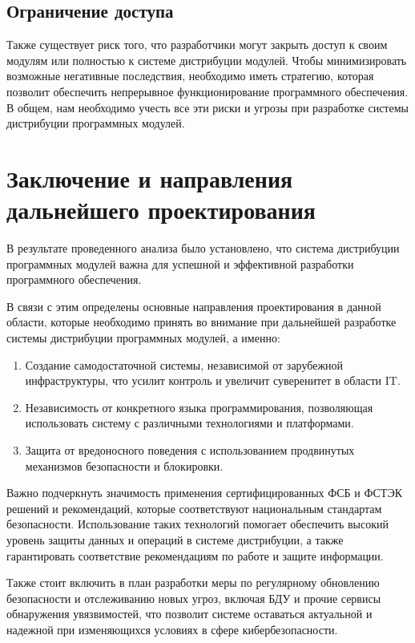 \subsection{Ограничение доступа}

Также существует риск того, что разработчики могут закрыть доступ к своим модулям или полностью к системе дистрибуции модулей. Чтобы минимизировать возможные негативные последствия, необходимо иметь стратегию, которая позволит обеспечить непрерывное функционирование программного обеспечения. В общем, нам необходимо учесть все эти риски и угрозы при разработке системы дистрибуции программных модулей. 

\section{Заключение и направления дальнейшего проектирования}

В результате проведенного анализа было установлено, что система дистрибуции программных модулей важна для успешной и эффективной разработки программного обеспечения. 

В связи с этим определены основные направления проектирования в данной области, которые необходимо принять во внимание при дальнейшей разработке системы дистрибуции программных модулей, а именно:

\begin{enumerate}
\item Создание самодостаточной системы, независимой от зарубежной инфраструктуры, что усилит контроль и увеличит суверенитет в области IT.
\item Независимость от конкретного языка программирования, позволяющая использовать систему с различными технологиями и платформами.
\item Защита от вредоносного поведения с использованием продвинутых механизмов безопасности и блокировки.
\end{enumerate}

Важно подчеркнуть значимость применения сертифицированных ФСБ и ФСТЭК решений и рекомендаций, которые соответствуют национальным стандартам безопасности. Использование таких технологий помогает обеспечить высокий уровень защиты данных и операций в системе дистрибуции, а также гарантировать соответствие рекомендациям по работе и защите информации.

Также стоит включить в план разработки меры по регулярному обновлению безопасности и отслеживанию новых угроз, включая БДУ и прочие сервисы обнаружения увязвимостей, что позволит системе оставаться актуальной и надежной при изменяющихся условиях в сфере кибербезопасности.

